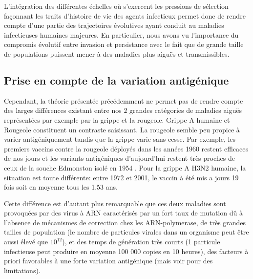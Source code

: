 L'intégration des différentes échelles où s'exercent les pressions de
sélection façonnant les traits d'histoire de vie des agents infectieux
permet donc de rendre compte d'une partie des trajectoires évolutives
ayant conduit au maladies infectieuses humaines majeures. En
particulier, nous avons vu l'importance du compromis évolutif entre
invasion et persistance avec le fait que de grande taille de
populations puissent mener à des maladies plus aiguës et
transmissibles.


\subsection{Prise en compte  de la variation antigénique}


Cependant, la théorie présentée précédemment ne permet pas de rendre
compte des larges différences existant entre nos 2 grandes catégories
de maladies aiguës représentées par exemple par la grippe et la
rougeole. Grippe A humaine et Rougeole constituent un contraste
saisissant. La rougeole semble peu propice à varier antigéniquement
tandis que la grippe varie sans cesse. Par exemple, les premiers
vaccins contre la rougeole déployés dans les années 1960 restent
efficaces de nos jours et les variants antigéniques d'aujourd'hui
restent très proches de ceux de la souche Edmonston isolé en 1954
\citep{Rota2003}. Pour la grippe A H3N2 humaine, la situation est
toute différente: entre 1972 et 2001, le vaccin à été mis a jours 19
fois \citep{Hay2001} soit en moyenne tous les 1.53 ans.

Cette différence est d'autant plus remarquable que ces deux maladies
sont provoquées par des virus à ARN caractérisés par un fort taux de
mutation dû à l'absence de mécanismes de correction chez les
ARN-polymerase, de très grandes tailles de population (le nombre de
particules virales dans un organisme peut être aussi élevé que
$10^{12}$), et des temps de génération très courts (1 particule
infectieuse peut produire en moyenne 100 000 copies en 10 heures), des
facteurs à priori favorables à une forte variation antigénique
\citep{Moya2004} (mais voir \citet{Belshaw2008, Duffy2008} pour des
limitations).

